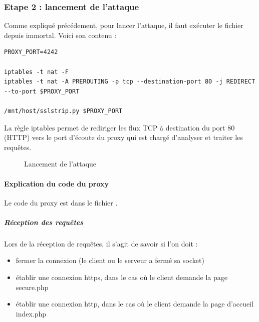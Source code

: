\subsubsection{Etape 2 : lancement de l'attaque}

Comme expliqué précédement, pour lancer l'attaque, il faut exécuter le fichier  depuis immortal. Voici son contenu :

\begin{verbatim}
PROXY_PORT=4242

iptables -t nat -F
iptables -t nat -A PREROUTING -p tcp --destination-port 80 -j REDIRECT --to-port $PROXY_PORT

/mnt/host/sslstrip.py $PROXY_PORT
\end{verbatim}

La règle iptables permet de rediriger les flux TCP à destination du port 80 (HTTP) vers le port d'écoute du proxy qui est chargé d'analyser et traiter les requêtes.

\begin{figure}[H]
  \caption{Lancement de l'attaque}
\end{figure}

\paragraph{Explication du code du proxy \\}

Le code du proxy est dans le fichier .

\subparagraph{Réception des requêtes \\}

Lors de la réception de requêtes, il s'agit de savoir si l'on doit :

\begin{itemize}
\item fermer la connexion (le client ou le serveur a fermé sa socket)
\item établir une connexion https, dans le cas où le client demande la page secure.php
\item établir une connexion http, dans le cas où le client demande la page d'accueil index.php
\end{itemize}

